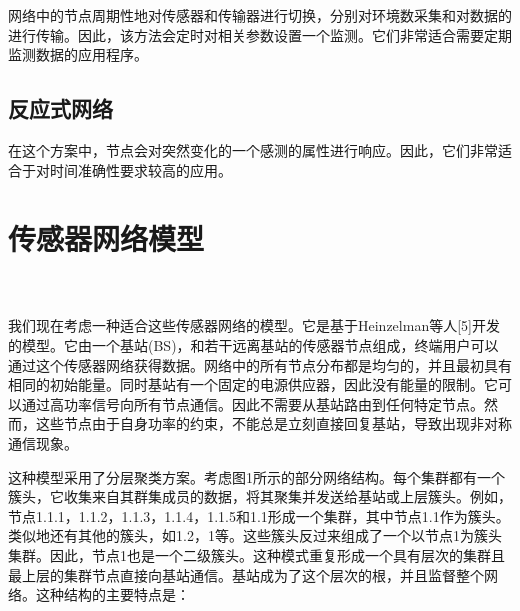 \documentclass[journal]{IEEEtran}
\begin{document}
\begin{CJK}{UTF8}{gbsn}
网络中的节点周期性地对传感器和传输器进行切换，分别对环境数采集和对数据的进行传输。因此，该方法会定时对相关参数设置一个监测。它们非常适合需要定期监测数据的应用程序。

\subsection{\textbf{反应式网络}}

在这个方案中，节点会对突然变化的一个感测的属性进行响应。因此，它们非常适合于对时间准确性要求较高的应用。

\section{\textbf{传感器网络模型\\ \\ }}

我们现在考虑一种适合这些传感器网络的模型。它是基于Heinzelman等人[5]开发的模型。它由一个基站(BS)，和若干远离基站的传感器节点组成，终端用户可以通过这个传感器网络获得数据。网络中的所有节点分布都是均匀的，并且最初具有相同的初始能量。同时基站有一个固定的电源供应器，因此没有能量的限制。它可以通过高功率信号向所有节点通信。因此不需要从基站路由到任何特定节点。然而，这些节点由于自身功率的约束，不能总是立刻直接回复基站，导致出现非对称通信现象。

这种模型采用了分层聚类方案。考虑图1所示的部分网络结构。每个集群都有一个簇头，它收集来自其群集成员的数据，将其聚集并发送给基站或上层簇头。例如，节点1.1.1，1.1.2，1.1.3，1.1.4，1.1.5和1.1形成一个集群，其中节点1.1作为簇头。类似地还有其他的簇头，如1.2，1等。这些簇头反过来组成了一个以节点1为簇头集群。因此，节点1也是一个二级簇头。这种模式重复形成一个具有层次的集群且最上层的集群节点直接向基站通信。基站成为了这个层次的根，并且监督整个网络。这种结构的主要特点是：


\end{CJK}
\end{document}
